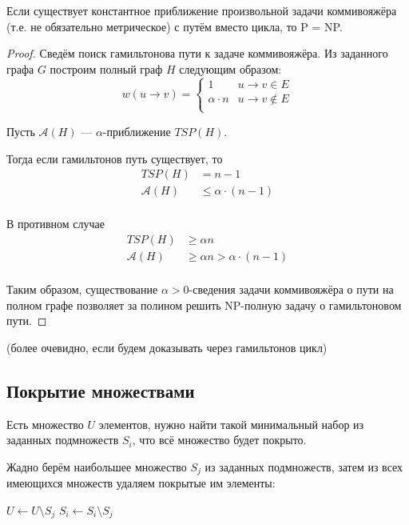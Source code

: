\begin{theorem}
    Если существует константное приближение
    произвольной задачи коммивояжёра
    (т.е. не обязательно метрическое)
    с путём вместо цикла,
    то P = NP.
\end{theorem}
\begin{proof}
    Сведём поиск гамильтонова пути к задаче коммивояжёра.
    Из заданного графа $G$ построим полный граф $H$
    следующим образом:
    \[
        w(u \to v) =
        \begin{cases}
            1 & u \to v \in E \\
            \alpha \cdot n & u \to v \notin E \\
        \end{cases}
    \]

    Пусть $\mathcal{A}(H)$ --- $\alpha$-приближение $TSP(H)$.

    Тогда если гамильтонов путь существует, то
    \begin{align*}
        TSP(H) & = n - 1 \\
        \mathcal{A}(H) & \le \alpha \cdot (n - 1) \\
    \end{align*}

    В противном случае
    \begin{align*}
        TSP(H) & \ge \alpha n \\
        \mathcal{A}(H) & \ge \alpha n > \alpha \cdot (n - 1) \\
    \end{align*}

    Таким образом, существование $\alpha > 0$-сведения
    задачи коммивояжёра о пути на полном графе
    позволяет за полином решить NP-полную задачу
    о гамильтоновом пути.
\end{proof}

(более очевидно, если будем доказывать через гамильтонов цикл)

\subsection{Покрытие множествами}
Есть множество $U$ элементов,
нужно найти такой минимальный набор из заданных подмножеств $S_i$,
что всё множество будет покрыто.

Жадно берём наибольшее множество $S_j$ из заданных подмножеств,
затем из всех имеющихся множеств удаляем покрытые им элементы:
\begin{algorithmic}
    \State $U \gets U \setminus S_j$
    \State $S_i \gets S_i \setminus S_j$
\end{algorithmic}

